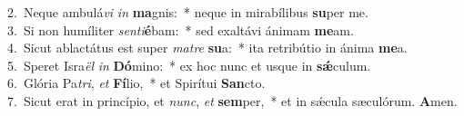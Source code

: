{2.~}Neque ambulá\textit{vi} \textit{in} \textbf{ma}gnis:~* neque in mirabílibus \textbf{su}per me.\\
{3.~}Si non humíliter \textit{sen}\textit{ti}\textbf{é}bam:~* sed exaltávi ánimam \textbf{me}am.\\
{4.~}Sicut ablactátus est super \textit{ma}\textit{tre} \textbf{su}a:~* ita retribútio in ánima \textbf{me}a.\\
{5.~}Speret Isra\textit{ël} \textit{in} \textbf{Dó}mino:~* ex hoc nunc et usque in \textbf{sǽ}culum.\\
{6.~}Glória Pa\textit{tri}, \textit{et} \textbf{Fí}lio,~* et Spirítui \textbf{San}cto.\\
{7.~}Sicut erat in princípio, et \textit{nunc}, \textit{et} \textbf{sem}per,~* et in sǽcula sæculórum. \textbf{A}men.\\
